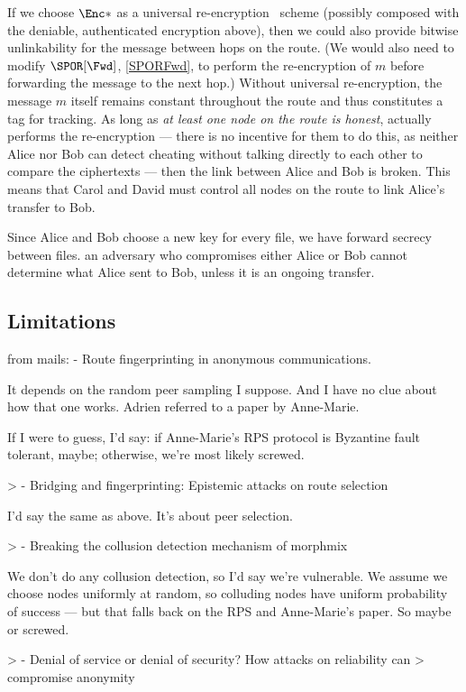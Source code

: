 If we choose \(\Enc*\) as a universal re-encryption~\cite{UniversalReencryption} 
scheme (possibly composed with the deniable, authenticated encryption above), 
then we could also provide bitwise unlinkability for the message between hops on 
the route.
(We would also need to modify \(\SPOR[\Fwd]\), \cref{SPORFwd}, to perform the 
re-encryption of \(m\) before forwarding the message to the next hop.)
Without universal re-encryption, the message \(m\) itself remains constant 
throughout the route and thus constitutes a tag for tracking.
As long as \emph{at least one node on the route is honest}, \ie actually 
performs the re-encryption --- there is no incentive for them to do this, as 
neither Alice nor Bob can detect cheating without talking directly to each other 
to compare the ciphertexts --- then the link between Alice and Bob is broken.
This means that Carol and David must control all nodes on the route to link 
Alice's transfer to Bob.

Since Alice and Bob choose a new key for every file, we have forward secrecy 
between files.
\Eg an adversary who compromises either Alice or Bob cannot determine what Alice 
sent to Bob, unless it is an ongoing transfer.


\subsection{Limitations}
from mails:  - Route fingerprinting in anonymous communications.

It depends on the random peer sampling I suppose. And I have no clue 
about how that one works. Adrien referred to a paper by Anne-Marie.

If I were to guess, I'd say: if Anne-Marie's RPS protocol is Byzantine 
fault tolerant, maybe; otherwise, we're most likely screwed.

> - Bridging and fingerprinting: Epistemic attacks on route selection

I'd say the same as above. It's about peer selection.

> - Breaking the collusion detection mechanism of morphmix

We don't do any collusion detection, so I'd say we're vulnerable. We 
assume we choose nodes uniformly at random, so colluding nodes have 
uniform probability of success --- but that falls back on the RPS and 
Anne-Marie's paper. So maybe or screwed.

> - Denial of service or denial of security? How attacks on reliability can
> compromise anonymity

